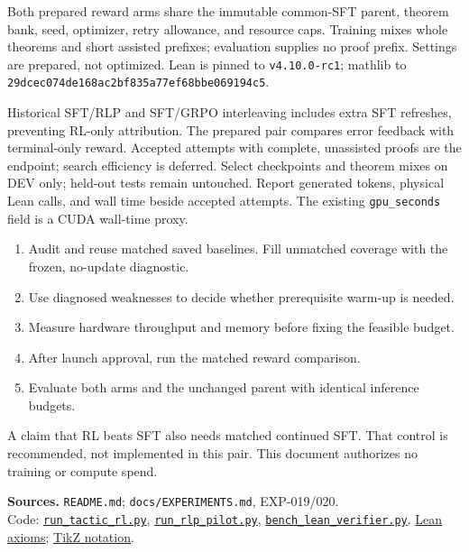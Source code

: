 \documentclass[11pt]{article}
\newcommand{\file}[1]{\nolinkurl{#1}}
\newcommand{\heading}[1]{\vspace{4pt}{\large\bfseries #1}\par}
\begin{document}
\heading{4. Hold the comparison fixed}
Both prepared reward arms share the immutable common-SFT parent, theorem bank, seed, optimizer, retry allowance, and resource caps.
Training mixes whole theorems and short assisted prefixes; evaluation supplies no proof prefix.
Settings are prepared, not optimized.
Lean is pinned to \file{v4.10.0-rc1}; mathlib to \file{29dcec074de168ac2bf835a77ef68bbe069194c5}.

Historical SFT/RLP and SFT/GRPO interleaving includes extra SFT refreshes, preventing RL-only attribution.
The prepared pair compares error feedback with terminal-only reward.
Accepted attempts with complete, unassisted proofs are the endpoint; search efficiency is deferred.
Select checkpoints and theorem mixes on DEV only; held-out tests remain untouched.
Report generated tokens, physical Lean calls, and wall time beside accepted attempts.
The existing \file{gpu_seconds} field is a CUDA wall-time proxy.

\heading{5. Follow the dependencies}
\begin{enumerate}
\item Audit and reuse matched saved baselines. Fill unmatched coverage with the frozen, no-update diagnostic.
\item Use diagnosed weaknesses to decide whether prerequisite warm-up is needed.
\item Measure hardware throughput and memory before fixing the feasible budget.
\item After launch approval, run the matched reward comparison.
\item Evaluate both arms and the unchanged parent with identical inference budgets.
\end{enumerate}
A claim that RL beats SFT also needs matched continued SFT.
That control is recommended, not implemented in this pair.
This document authorizes no training or compute spend.

\vfill
{\small\textbf{Sources.}
\file{README.md}; \file{docs/EXPERIMENTS.md}, EXP-019/020.\\
Code:
\href{../../scripts/train/run_tactic_rl.py}{\texttt{run\_tactic\_rl.py}},
\href{../../scripts/train/run_rlp_pilot.py}{\texttt{run\_rlp\_pilot.py}},
\href{../../scripts/eval/bench_lean_verifier.py}{\texttt{bench\_lean\_verifier.py}}.
\href{https://lean-lang.org/theorem_proving_in_lean4/Axioms-and-Computation/}{Lean axioms};
\href{https://tikz.dev/tikz-arrows}{TikZ notation}.}
\end{document}
